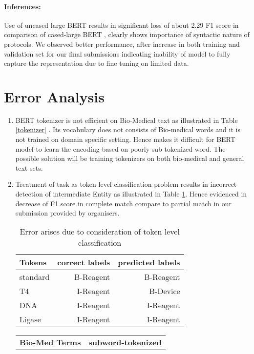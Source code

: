 \documentclass[11pt,a4paper]{article}
\begin{document}
\paragraph{Inferences:} Use of uncased large BERT results in significant loss of about 2.29 F1 score in comparison of cased-large BERT \cite{devlin2018pretraining}, clearly shows importance of syntactic nature of protocols. We observed better performance, after increase in both training and validation set for our final submissions indicating inability of model to fully capture the representation due to fine tuning on limited data.
\section{Error Analysis}
\begin{enumerate}
\item BERT tokenizer is not efficient on Bio-Medical text as illustrated in Table \ref{tokenizer}
. Its vocabulary does not consists of Bio-medical words and it is not trained on domain specific setting. Hence makes it difficult for BERT model to learn the encoding based on poorly sub tokenized word. The possible solution will be training tokenizers on both bio-medical and general text sets.
\item Treatment of task as token level classification problem results in incorrect detection of intermediate Entity as illustrated in Table \ref{err}. Hence evidenced in decrease of F1 score in complete match compare to partial match in our submission  provided by organisers.
\begin{table}
\centering
\begin{tabular}{lrr}
\hline \textbf{Tokens} & \textbf{correct labels} & \textbf{predicted labels} \\ \hline

standard & B-Reagent & B-Reagent \\
T4 & I-Reagent & B-Device \\
DNA & I-Reagent & I-Reagent \\
Ligase & I-Reagent & I-Reagent \\

\hline
\end{tabular}
\caption{\label{err} Error arises due to consideration of token level classification  }
\end{table}

\begin{table}
\centering
\begin{tabular}{ll}
\hline \textbf{Bio-Med Terms} & \textbf{subword-tokenized} \\ 


\end{tabular}
\end{table}
\end{enumerate}
\end{document}
